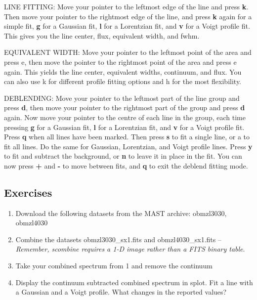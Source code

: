 LINE FITTING: Move your pointer to the leftmost edge of the line and press {\bf k}. Then move your pointer to the rightmost edge of the line, and press {\bf k} again for a simple fit, {\bf g} for a Gaussian fit, {\bf l} for a Lorentzian fit, and {\bf v} for a Voigt profile fit. This gives you the line center, flux, equivalent width, and fwhm.

EQUIVALENT WIDTH: Move your pointer to the leftmost point of the area and press e, then move the pointer to the rightmost point of the area and press e again. This yields the line center, equivalent widths, continuum, and flux. You can also use k for different profile fitting options and h for the most flexibility.

DEBLENDING: Move your pointer to the leftmost part of the line group and press {\bf d}, then move your pointer to the rightmost part of the group and press {\bf d} again. Now move your pointer to the centre of each line in the group, each time pressing {\bf g} for a Gaussian fit, {\bf l} for a Lorentzian fit, and {\bf v} for a Voigt profile fit. Press {\bf q} when all lines have been marked. Then press {\bf s} to fit a single line, or a to fit all lines. Do the same for Gaussian, Lorentzian, and Voigt profile lines. Press {\bf y} to fit and subtract the background, or {\bf n} to leave it in place in the fit. You can now press {\bf +} and {\bf -} to move between fits, and {\bf q} to exit the deblend fitting mode.


\subsection{Exercises}
\begin{enumerate}

\item Download the following datasets from the MAST archive: obmzl3030, obmzl4030
\item Combine the datasets obmzl3030\_sx1.fits and obmzl4030\_sx1.fits -- \emph{Remember, scombine requires a 1-D image rather than a FITS binary table}.
\item Take your combined spectrum from 1 and remove the continuum
\item Display the continuum subtracted combined spectrum in splot. Fit a line with a Gaussian and a Voigt profile. What changes in the reported values?
\end{enumerate}